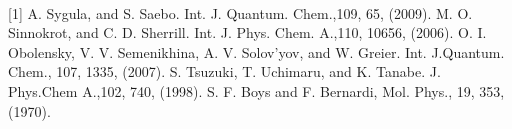 \\
{\footnotesize
[1] A. Sygula, and S. Saebo. Int. J. Quantum. Chem.,109, 65, (2009).
\newline
[2] M. O. Sinnokrot, and C. D. Sherrill. Int. J. Phys. Chem. A.,110, 10656, (2006).
\newline
[3] O. I. Obolensky, V. V. Semenikhina, A. V. Solov'yov, and W. Greier. Int. J.Quantum. Chem., 107, 1335, (2007).
\newline
[4] S. Tsuzuki, T. Uchimaru, and K. Tanabe. J. Phys.Chem A.,102, 740, (1998).
\newline
[5] S. F. Boys and F. Bernardi, Mol. Phys., 19, 353, (1970).
}
\newpage
